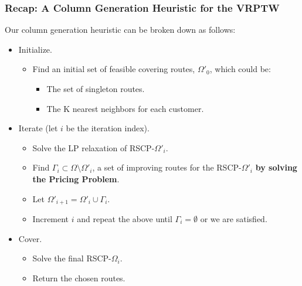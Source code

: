 \documentclass{beamer}
\begin{document}
	\begin{frame}[t]
		\frametitle{Recap: A Column Generation Heuristic for the VRPTW}
		\small
		\vspace{-.25cm}
		Our column generation heuristic can be broken down as follows:
		\begin{itemize}
			\item Initialize.
			\begin{itemize}
				\item Find an initial set of feasible covering routes, $ \Omega'_0 $, which could be:
				\begin{itemize}
					\item The set of singleton routes.
					\item The K nearest neighbors for each customer.
				\end{itemize}
			\end{itemize}
			\item Iterate (let $ i $ be the iteration index).
			\begin{itemize}
				\item Solve the LP relaxation of RSCP-$ \Omega'_i $.
				\item Find $ \Gamma_i \subset \Omega \setminus \Omega'_i $, a set of improving routes for the RSCP-$ \Omega'_i $ \textbf{by solving the Pricing Problem}.
				\item Let $ \Omega'_{i+1} = \Omega'_i \cup \Gamma_i $.
				\item Increment $ i $ and repeat the above until $ \Gamma_i = \emptyset $ or we are satisfied.
			\end{itemize}
			\item Cover.
			\begin{itemize}
				\item Solve the final RSCP-$ \Omega_i $.
				\item Return the chosen routes.
			\end{itemize}
		\end{itemize}
		\normalsize
	\end{frame}
\end{document}
